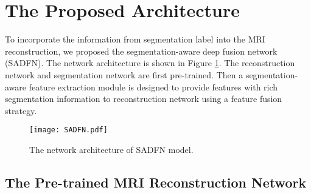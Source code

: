 \documentclass[runningheads]{llncs}
\begin{document}
\section{The Proposed Architecture}
\label{TheproArchi}

To incorporate the information from segmentation label into the MRI reconstruction, we proposed the segmentation-aware deep fusion network (SADFN). The network architecture is shown in Figure \ref{fig2}. The reconstruction network and segmentation network are first pre-trained. Then a segmentation-aware feature extraction module is designed to provide features with rich segmentation information to reconstruction network using a feature fusion strategy.

\begin{figure}[htb!]
\begin{center}{\texttt{[image: SADFN.pdf]}}
   \caption{The network architecture of SADFN model.}
\label{fig2}
\end{center}
\end{figure}

\subsection{The Pre-trained MRI Reconstruction Network}
\label{BaselineRec}
\end{document}
